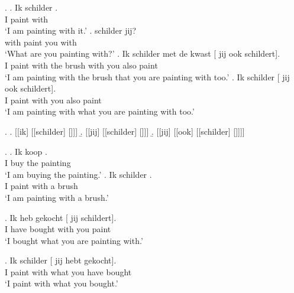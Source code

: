 \documentclass[xcolor=dvipsnames,10pt]{beamer}
\begin{document}
\begin{frame}

\ex.
\ag. Ik schilder  .\\
 I paint  with\\
 `I am painting with it.'\label{ex:const1}
\bg.   schilder jij?\\
  with paint you with\\
 `What are you painting with?'\label{ex:const2}
\bg. Ik schilder met de kwast [  jij ook schildert].\\
 I paint with the brush  with you also paint\\
 `I am painting with the brush that you are painting with too.'\label{ex:const3}
\bg. Ik schilder [  jij ook schildert].\\
 I paint  with you also paint\\
 `I am painting with what you are painting with too.'\label{ex:const4}

\pause

\ex.
\a. [[ik] [[schilder] []]]\label{ex:const1stage}
\b. [[jij] [[schilder] []]]\label{ex:const2stage}
\b. [[jij] [[ook] [[schilder] []]]]\label{ex:const3stage}

\end{frame}


\begin{frame}

\ex.
\ag. Ik koop  .\\
 I buy the painting\\
 `I am buying the painting.'\label{ex:kopen}
\bg. Ik schilder   .\\
 I paint with a brush\\
 `I am painting with a brush.'\label{ex:schilderen}

 \pause

\exg. Ik heb gekocht [  jij schildert].\\
 I have bought  with you paint\\
 `I bought what you are painting with.'\label{ex:mismatchwaar-mee}

 \pause

\exg. Ik schilder  [ jij hebt gekocht].\\
 I paint with what you have bought\\
 `I paint with what you bought.'\label{ex:mismatchmetwat}

\end{frame}
\end{document}
